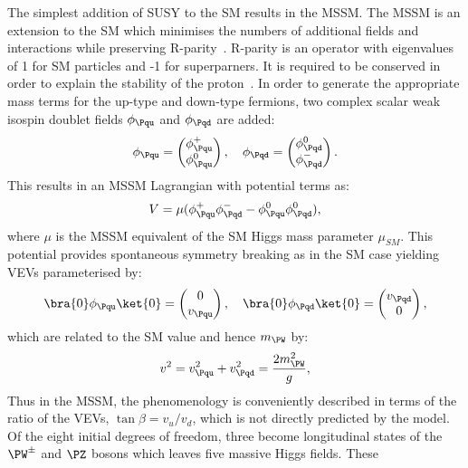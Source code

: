 The simplest addition of \ac{SUSY} to the \ac{SM} results in the \ac{MSSM}. The
\ac{MSSM} is an extension to the \ac{SM} which minimises the numbers of
additional fields and interactions while preserving R-parity~\cite{Dimopoulos:1981zb}. R-parity
is an operator with eigenvalues of 1 for \ac{SM} particles and -1 for
superparners. It is required to be conserved in order to explain the stability
of the proton~\cite{PDG}. In order to generate the appropriate mass terms for the up-type 
and down-type fermions, two complex scalar weak isospin doublet fields
$\phi_{\Pqu}$ and $\phi_{\Pqd}$ are added:
\begin{equation}
\phi_{\Pqu} = \begin{pmatrix}\phi_{\Pqu}^{+} \\ \phi_{\Pqu}^{0} \end{pmatrix}, \quad
\phi_{\Pqd} = \begin{pmatrix}\phi_{\Pqd}^{0} \\ \phi_{\Pqd}^{-} \end{pmatrix}. 
\end{equation}
This results in an \ac{MSSM} Lagrangian with potential terms as:
\begin{equation}
V=\mu(\phi_{\Pqu}^{+}\phi_{\Pqd}^{-} - \phi_{\Pqu}^{0}\phi_{\Pqd}^{0}),
\end{equation}
where $\mu$ is the \ac{MSSM} equivalent of the \ac{SM} Higgs mass parameter
$\mu_{SM}$. This potential provides spontaneous symmetry breaking as in the
\ac{SM} case yielding VEVs parameterised by:
\begin{equation}
\bra{0}\phi_{\Pqu}\ket{0} = \begin{pmatrix} 0 \\ v_{\Pqu}  \end{pmatrix}, \quad
\bra{0}\phi_{\Pqd}\ket{0} = \begin{pmatrix} v_{\Pqd} \\ 0 \end{pmatrix},
\end{equation}
which are related to the \ac{SM} value and hence $m_{\PW}$ by: 
\begin{equation}
v^{2} = v_{\Pqu}^{2} +  v_{\Pqd}^{2} =  \frac{2m_{\PW}^{2}}{g},
\end{equation}
Thus in the \ac{MSSM}, the
phenomenology is conveniently described in terms of the ratio of the VEVs,
$\tan\beta = v_{u}/v_{d}$, which is not directly predicted by the model.
Of the eight initial degrees of freedom, three become longitudinal states of the
$\PW^{\pm}$ and $\PZ$ bosons which leaves five massive Higgs fields. These
